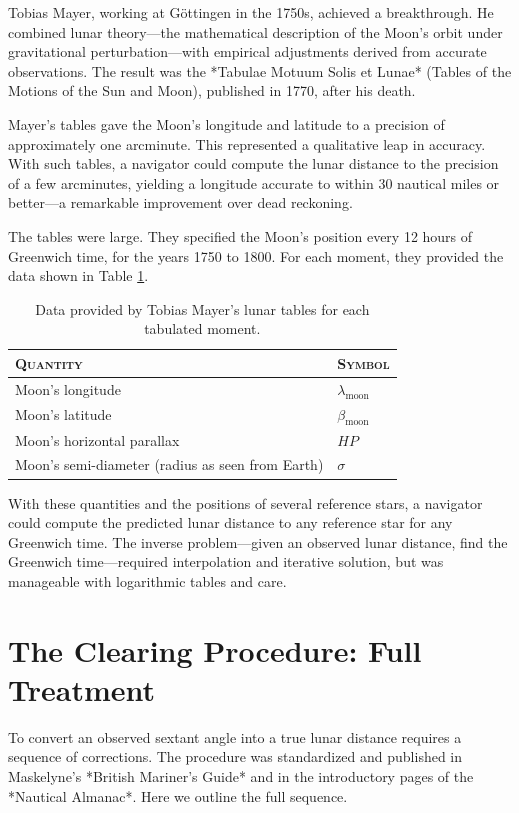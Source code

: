 Tobias Mayer, working at Göttingen in the 1750s, achieved a breakthrough. He combined lunar theory—the mathematical description of the Moon's orbit under gravitational perturbation—with empirical adjustments derived from accurate observations. The result was the *Tabulae Motuum Solis et Lunae* (Tables of the Motions of the Sun and Moon), published in 1770, after his death.

Mayer's tables gave the Moon's longitude and latitude to a precision of approximately one arcminute. This represented a qualitative leap in accuracy. With such tables, a navigator could compute the lunar distance to the precision of a few arcminutes, yielding a longitude accurate to within 30 nautical miles or better—a remarkable improvement over dead reckoning.

The tables were large. They specified the Moon's position every 12 hours of Greenwich time, for the years 1750 to 1800. For each moment, they provided the data shown in Table \ref{tab:mayer-data}.

\begin{table}[htbp]
\centering
\caption{Data provided by Tobias Mayer's lunar tables for each tabulated moment.}
\label{tab:mayer-data}
\begin{tabular}{ll}
\toprule
\textsc{Quantity} & \textsc{Symbol} \\
\midrule
Moon's longitude & $\lambda_{\text{moon}}$ \\
Moon's latitude & $\beta_{\text{moon}}$ \\
Moon's horizontal parallax & $HP$ \\
Moon's semi-diameter (radius as seen from Earth) & $\sigma$ \\
\bottomrule
\end{tabular}
\end{table}

With these quantities and the positions of several reference stars, a navigator could compute the predicted lunar distance to any reference star for any Greenwich time. The inverse problem—given an observed lunar distance, find the Greenwich time—required interpolation and iterative solution, but was manageable with logarithmic tables and care.

\section{The Clearing Procedure: Full Treatment}

To convert an observed sextant angle into a true lunar distance requires a sequence of corrections. The procedure was standardized and published in Maskelyne's *British Mariner's Guide* and in the introductory pages of the *Nautical Almanac*. Here we outline the full sequence.

